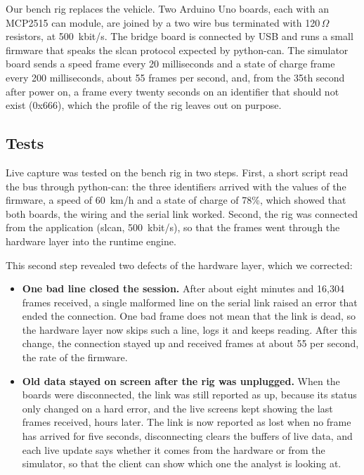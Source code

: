 Our bench rig replaces the vehicle. Two Arduino Uno boards, each with an MCP2515 \gls{can} module, are joined by a two wire bus terminated with 120\,$\Omega$ resistors, at 500~kbit/s. The bridge board is connected by USB and runs a small firmware that speaks the slcan protocol expected by python-can. The simulator board sends a speed frame every 20 milliseconds and a state of charge frame every 200 milliseconds, about 55 frames per second, and, from the 35th second after power on, a frame every twenty seconds on an identifier that should not exist (0x666), which the profile of the rig leaves out on purpose.

\subsection{Tests}
\label{sec:validation-bench}

Live capture was tested on the bench rig in two steps. First, a short script read the bus through python-can: the three identifiers arrived with the values of the firmware, a speed of 60~km/h and a state of charge of 78\%, which showed that both boards, the wiring and the serial link worked. Second, the rig was connected from the application (slcan, 500~kbit/s), so that the frames went through the hardware layer into the runtime engine.

This second step revealed two defects of the hardware layer, which we corrected:

\begin{itemize}
    \item \textbf{One bad line closed the session.} After about eight minutes and 16{,}304 frames received, a single malformed line on the serial link raised an error that ended the connection. One bad frame does not mean that the link is dead, so the hardware layer now skips such a line, logs it and keeps reading. After this change, the connection stayed up and received frames at about 55 per second, the rate of the firmware.
    \item \textbf{Old data stayed on screen after the rig was unplugged.} When the boards were disconnected, the link was still reported as up, because its status only changed on a hard error, and the live screens kept showing the last frames received, hours later. The link is now reported as lost when no frame has arrived for five seconds, disconnecting clears the buffers of live data, and each live update says whether it comes from the hardware or from the simulator, so that the client can show which one the analyst is looking at.
\end{itemize}

